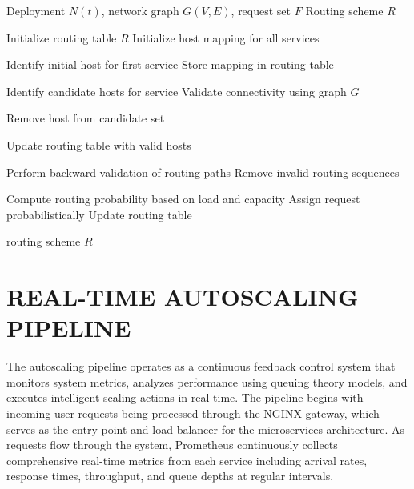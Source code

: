 \begin{algorithm}[H]
\caption{FPR (Detailed)}
\begin{algorithmic}[1]

\Require Deployment $N(t)$, network graph $G(V,E)$, request set $F$
\Ensure Routing scheme $R$

\State Initialize routing table $R$
\State Initialize host mapping for all services


    \State Identify initial host for first service
    \State Store mapping in routing table


        \State Identify candidate hosts for service
        \State Validate connectivity using graph $G$

                \State Remove host from candidate set
            \EndIf
        \EndFor

        \State Update routing table with valid hosts

    \EndFor

    \State Perform backward validation of routing paths
    \State Remove invalid routing sequences

        \State Compute routing probability based on load and capacity
        \State Assign request probabilistically
        \State Update routing table
    \EndFor

\EndFor

\State \Return routing scheme $R$

\end{algorithmic}
\end{algorithm}

\section{REAL-TIME AUTOSCALING PIPELINE}

The autoscaling pipeline operates as a continuous feedback control system that monitors system metrics, analyzes performance using queuing theory models, and executes intelligent scaling actions in real-time. The pipeline begins with incoming user requests being processed through the NGINX gateway, which serves as the entry point and load balancer for the microservices architecture. As requests flow through the system, Prometheus continuously collects comprehensive real-time metrics from each service including arrival rates, response times, throughput, and queue depths at regular intervals.


